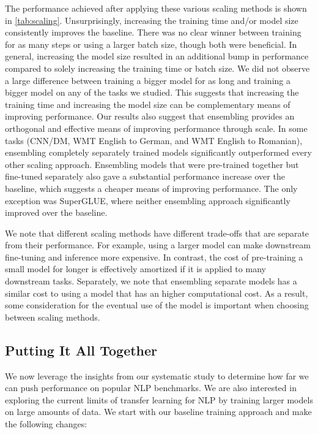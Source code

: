 \documentclass[twoside,11pt]{article}
\begin{document}
The performance achieved after applying these various scaling methods is shown in \cref{tab:scaling}.
Unsurprisingly, increasing the training time and/or model size consistently improves the baseline.
There was no clear winner between training for  as many steps or using a  larger batch size, though both were beneficial.
In general, increasing the model size resulted in an additional bump in performance compared to solely increasing the training time or batch size.
We did not observe a large difference between training a  bigger model for  as long and training a  bigger model on any of the tasks we studied.
This suggests that increasing the training time and increasing the model size can be complementary means of improving performance.
Our results also suggest that ensembling provides an orthogonal and effective means of improving performance through scale.
In some tasks (CNN/DM, WMT English to German, and WMT English to Romanian), ensembling  completely separately trained models significantly outperformed every other scaling approach.
Ensembling models that were pre-trained together but fine-tuned separately also gave a substantial performance increase over the baseline, which suggests a cheaper means of improving performance.
The only exception was SuperGLUE, where neither ensembling approach significantly improved over the baseline.

We note that different scaling methods have different trade-offs that are separate from their performance.
For example, using a larger model can make downstream fine-tuning and inference more expensive.
In contrast, the cost of pre-training a small model for longer is effectively amortized if it is applied to many downstream tasks.
Separately, we note that ensembling  separate models has a similar cost to using a model that has an  higher computational cost.
As a result, some consideration for the eventual use of the model is important when choosing between scaling methods.

\subsection{Putting It All Together}
\label{sec:together}

We now leverage the insights from our systematic study to determine how far we can push performance on popular NLP benchmarks.
We are also interested in exploring the current limits of transfer learning for NLP by training larger models on large amounts of data.
We start with our baseline training approach and make the following changes:
\end{document}
